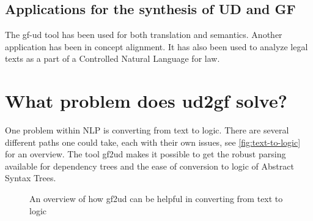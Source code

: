 


\subsection{Applications for the synthesis of UD and GF}

The gf-ud tool has been used for both translation and semantics\cite{ranta-al-2020}. %
Another application has been in concept alignment\cite{masciolini-ranta-2021}.
It has also been used to analyze legal texts as a part of a Controlled Natural Language for law\cite{listenmaa-etal-2021-towards}.

\section{What problem does ud2gf solve?}
%
%

One problem within NLP is converting from text to logic. There are several different paths one could take, each with their own issues, see \autoref{fig:text-to-logic} for an overview. The tool gf2ud makes it possible to get the robust parsing available for dependency trees and the ease of conversion to logic of Abstract Syntax Trees.

\begin{figure}[H]
    \centering
    \caption{An overview of how gf2ud can be helpful in converting from text to logic}
    \label{fig:text-to-logic}
\end{figure}

